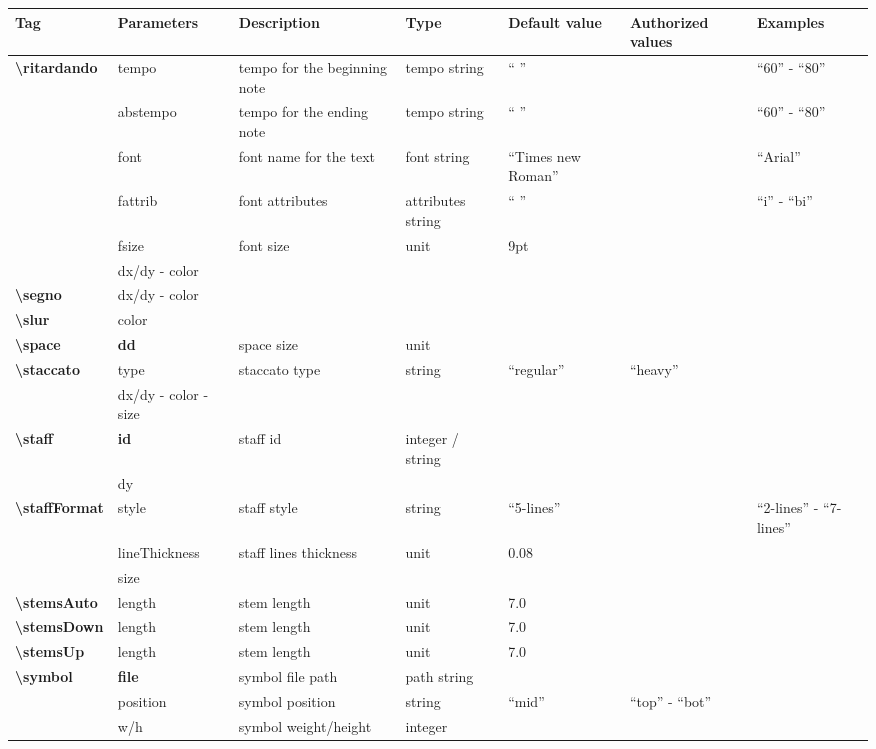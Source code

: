 \documentclass[a4paper, landscape, 10pt]{article}
\begin{document}
\begin{tabularx}{\linewidth}{p{3cm}p{3cm}p{5cm}p{3cm}p{2.5cm}p{3.5cm}p{4cm}}
    \hline
    \textbf{Tag}&\textbf{Parameters}&\textbf{Description}&\textbf{Type}&\textbf{Default value}&\textbf{Authorized values}&\textbf{Examples}\\
    \hline
    \textbf{\textbackslash{}ritardando}&tempo&tempo for the beginning note&tempo string&`` ''&&``60'' - ``80''\\
    &abstempo&tempo for the ending note&tempo string&`` ''&&``60'' - ``80''\\
    &font&font name for the text&font string&``Times new Roman''&&``Arial''\\
    &fattrib&font attributes&attributes string&`` ''&&``i'' - ``bi''\\
    &fsize&font size&unit&9pt&&\\
    &dx/dy - color&&&&&\\
    \hline
	\textbf{\textbackslash{}segno}&dx/dy - color&&&&&\\
    \hline
	\textbf{\textbackslash{}slur}&color&&&&&\\
    \hline
    \textbf{\textbackslash{}space}&\textbf{dd}&space size&unit&&&\\
    \hline
    \textbf{\textbackslash{}staccato}&type&staccato type&string&``regular''&``heavy''&\\
    &dx/dy - color - size&&&&&\\
    \hline
    \textbf{\textbackslash{}staff}&\textbf{id}&staff id&integer / string&&&\\
    &dy&&&&&\\
    \hline
    \textbf{\textbackslash{}staffFormat}&style&staff style&string&``5-lines''&&``2-lines'' - ``7-lines''\\
    &lineThickness&staff lines thickness&unit&0.08&&\\
    &size&&&&&\\
    \hline
    \textbf{\textbackslash{}stemsAuto}&length&stem length&unit&7.0&&\\
    \hline
    \textbf{\textbackslash{}stemsDown}&length&stem length&unit&7.0&&\\
    \hline
    \textbf{\textbackslash{}stemsUp}&length&stem length&unit&7.0&&\\
    \hline
    \textbf{\textbackslash{}symbol}&\textbf{file}&symbol file path&path string&&&\\
    &position&symbol position&string&``mid''&``top'' - ``bot''&\\
    &w/h&symbol weight/height&integer&&&\\

\end{tabularx}
\end{document}
